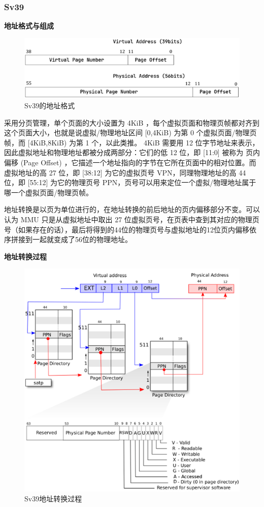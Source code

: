 \subsubsection{Sv39}

\textbf{地址格式与组成}

\begin{figure}[htb]
    \figureCapSet
    \centering
    \includegraphics[width=.8\linewidth]{figure/c2/addressstructure.png}
    \caption{Sv39的地址格式}
    \label{figure:c2addressstructure}
\end{figure}

采用分页管理，单个页面的大小设置为 4KiB ，每个虚拟页面和物理页帧都对齐到这个页面大小，也就是说虚拟/物理地址区间 [0,4KiB) 为第 0 个虚拟页面/物理页帧，而 [4KiB,8KiB) 为第 1 个，以此类推。 4KiB 需要用 12 位字节地址来表示，因此虚拟地址和物理地址都被分成两部分：它们的低 12 位，即 [11:0] 被称为 页内偏移 (Page Offset) ，它描述一个地址指向的字节在它所在页面中的相对位置。而虚拟地址的高 27 位，即 [38:12] 为它的虚拟页号 VPN，同理物理地址的高 44 位，即 [55:12] 为它的物理页号 PPN，页号可以用来定位一个虚拟/物理地址属于哪一个虚拟页面/物理页帧。

地址转换是以页为单位进行的，在地址转换的前后地址的页内偏移部分不变。可以认为 MMU 只是从虚拟地址中取出 27 位虚拟页号，在页表中查到其对应的物理页号（如果存在的话），最后将得到的44位的物理页号与虚拟地址的12位页内偏移依序拼接到一起就变成了56位的物理地址。


\textbf{地址转换过程}

\begin{figure}[htb]
    \figureCapSet
    \centering
    \includegraphics[width=.8\linewidth]{figure/c2/addressv2p.png}
    \caption{Sv39地址转换过程}
    \label{figure:c2addressv2p}
\end{figure}


